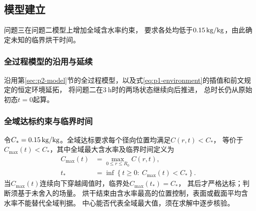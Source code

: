 \subsection{模型建立}
\label{sec:p3-model}

问题三在问题二模型上增加全域含水率约束，
要求各处均低于$0.15\,\mathrm{kg/kg}$，由此确定未知的临界烘干时间。

\subsubsection{全过程模型的沿用与延续}

沿用第\ref{sec:p2-model}节的全过程模型，以及式\eqref{eq:p1-environment}的插值和前文规定的恒定环境延拓，
将问题二在$3\ \mathrm{h}$时的两场状态继续向后推进，
总时长仍从原始初态$t=0$起算。

\subsubsection{全域达标约束与临界时间}

令$C_*=0.15\,\mathrm{kg/kg}$。全域达标要求每个径向位置均满足$C(r,t)<C_*$，
等价于$C_{\max}(t)<C_*$，其中全域最大含水率及临界时间定义为
\begin{align}
  C_{\max}(t)&=\max_{0\le r\le R_0}C(r,t),
  \label{eq:p3-maximum}\\
  t_*&=\inf\left\{t\ge0:\ C_{\max}(t)<C_*\right\}.
  \label{eq:p3-endpoint}
\end{align}
当$C_{\max}(t)$连续向下穿越阈值时，临界处$C_{\max}(t_*)=C_*$，
其后才严格达标；判断须基于未舍入的场量。
烘干结束由含水率最高的位置控制，表面或截面平均含水率不能替代全域判据。
中心能否代表全域最大值，须在求解中逐步核验。
